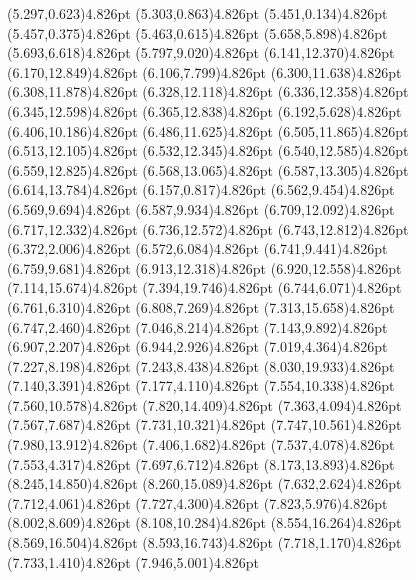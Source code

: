 \documentclass[10pt]{article}
\begin{document}
{{\qdisk(5.297,0.623){4.826pt}%
\qdisk(5.303,0.863){4.826pt}%
\qdisk(5.451,0.134){4.826pt}%
\qdisk(5.457,0.375){4.826pt}%
\qdisk(5.463,0.615){4.826pt}%
\qdisk(5.658,5.898){4.826pt}%
\qdisk(5.693,6.618){4.826pt}%
\qdisk(5.797,9.020){4.826pt}%
\qdisk(6.141,12.370){4.826pt}%
\qdisk(6.170,12.849){4.826pt}%
\qdisk(6.106,7.799){4.826pt}%
\qdisk(6.300,11.638){4.826pt}%
\qdisk(6.308,11.878){4.826pt}%
\qdisk(6.328,12.118){4.826pt}%
\qdisk(6.336,12.358){4.826pt}%
\qdisk(6.345,12.598){4.826pt}%
\qdisk(6.365,12.838){4.826pt}%
\qdisk(6.192,5.628){4.826pt}%
\qdisk(6.406,10.186){4.826pt}%
\qdisk(6.486,11.625){4.826pt}%
\qdisk(6.505,11.865){4.826pt}%
\qdisk(6.513,12.105){4.826pt}%
\qdisk(6.532,12.345){4.826pt}%
\qdisk(6.540,12.585){4.826pt}%
\qdisk(6.559,12.825){4.826pt}%
\qdisk(6.568,13.065){4.826pt}%
\qdisk(6.587,13.305){4.826pt}%
\qdisk(6.614,13.784){4.826pt}%
\qdisk(6.157,0.817){4.826pt}%
\qdisk(6.562,9.454){4.826pt}%
\qdisk(6.569,9.694){4.826pt}%
\qdisk(6.587,9.934){4.826pt}%
\qdisk(6.709,12.092){4.826pt}%
\qdisk(6.717,12.332){4.826pt}%
\qdisk(6.736,12.572){4.826pt}%
\qdisk(6.743,12.812){4.826pt}%
\qdisk(6.372,2.006){4.826pt}%
\qdisk(6.572,6.084){4.826pt}%
\qdisk(6.741,9.441){4.826pt}%
\qdisk(6.759,9.681){4.826pt}%
\qdisk(6.913,12.318){4.826pt}%
\qdisk(6.920,12.558){4.826pt}%
\qdisk(7.114,15.674){4.826pt}%
\qdisk(7.394,19.746){4.826pt}%
\qdisk(6.744,6.071){4.826pt}%
\qdisk(6.761,6.310){4.826pt}%
\qdisk(6.808,7.269){4.826pt}%
\qdisk(7.313,15.658){4.826pt}%
\qdisk(6.747,2.460){4.826pt}%
\qdisk(7.046,8.214){4.826pt}%
\qdisk(7.143,9.892){4.826pt}%
\qdisk(6.907,2.207){4.826pt}%
\qdisk(6.944,2.926){4.826pt}%
\qdisk(7.019,4.364){4.826pt}%
\qdisk(7.227,8.198){4.826pt}%
\qdisk(7.243,8.438){4.826pt}%
\qdisk(8.030,19.933){4.826pt}%
\qdisk(7.140,3.391){4.826pt}%
\qdisk(7.177,4.110){4.826pt}%
\qdisk(7.554,10.338){4.826pt}%
\qdisk(7.560,10.578){4.826pt}%
\qdisk(7.820,14.409){4.826pt}%
\qdisk(7.363,4.094){4.826pt}%
\qdisk(7.567,7.687){4.826pt}%
\qdisk(7.731,10.321){4.826pt}%
\qdisk(7.747,10.561){4.826pt}%
\qdisk(7.980,13.912){4.826pt}%
\qdisk(7.406,1.682){4.826pt}%
\qdisk(7.537,4.078){4.826pt}%
\qdisk(7.553,4.317){4.826pt}%
\qdisk(7.697,6.712){4.826pt}%
\qdisk(8.173,13.893){4.826pt}%
\qdisk(8.245,14.850){4.826pt}%
\qdisk(8.260,15.089){4.826pt}%
\qdisk(7.632,2.624){4.826pt}%
\qdisk(7.712,4.061){4.826pt}%
\qdisk(7.727,4.300){4.826pt}%
\qdisk(7.823,5.976){4.826pt}%
\qdisk(8.002,8.609){4.826pt}%
\qdisk(8.108,10.284){4.826pt}%
\qdisk(8.554,16.264){4.826pt}%
\qdisk(8.569,16.504){4.826pt}%
\qdisk(8.593,16.743){4.826pt}%
\qdisk(7.718,1.170){4.826pt}%
\qdisk(7.733,1.410){4.826pt}%
\qdisk(7.946,5.001){4.826pt}%
}}
\end{document}

